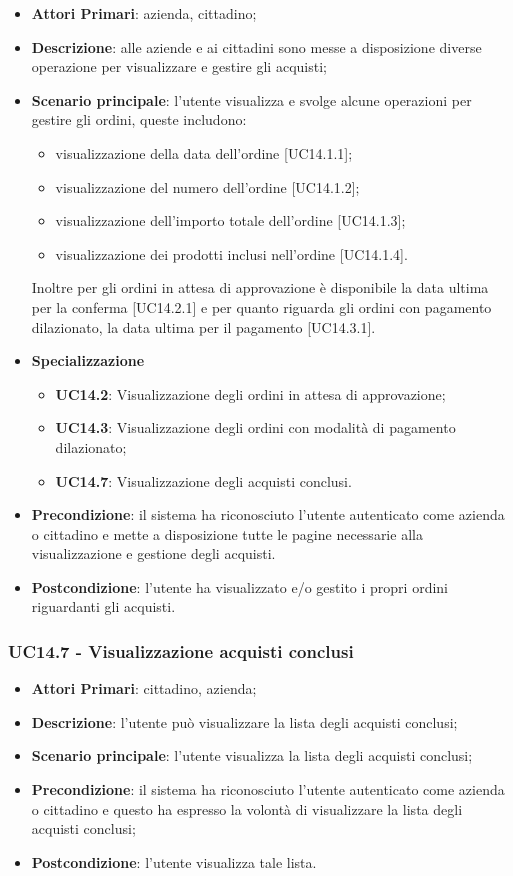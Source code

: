 \begin{itemize}
	\item \textbf{Attori Primari}: azienda, cittadino;
	\item \textbf{Descrizione}: alle aziende e ai cittadini sono messe a disposizione diverse operazione per visualizzare e gestire gli acquisti;
	\item \textbf{Scenario principale}: l'utente visualizza e svolge alcune operazioni per gestire gli ordini, queste includono:
	\begin{itemize}
		\item visualizzazione della data dell'ordine [UC14.1.1];
		\item visualizzazione del numero dell'ordine [UC14.1.2];
		\item visualizzazione dell'importo totale dell'ordine [UC14.1.3];
		\item visualizzazione dei prodotti inclusi nell'ordine [UC14.1.4].
	\end{itemize}
	Inoltre per gli ordini in attesa di approvazione è disponibile la data ultima per la conferma [UC14.2.1] e per quanto riguarda gli ordini con pagamento dilazionato,  la data ultima per il pagamento [UC14.3.1].
	\item \textbf{Specializzazione}
	\begin{itemize}
		\item \textbf{UC14.2}: Visualizzazione degli ordini in attesa di approvazione;
		\item \textbf{UC14.3}: Visualizzazione degli ordini con modalità di pagamento dilazionato;
		\item \textbf{UC14.7}: Visualizzazione degli acquisti conclusi.
	\end{itemize}
	\item \textbf{Precondizione}: il sistema ha riconosciuto l'utente autenticato come azienda o cittadino e mette a disposizione tutte le pagine necessarie alla visualizzazione e gestione degli acquisti.
	\item \textbf{Postcondizione}: l'utente ha visualizzato e/o gestito i propri ordini riguardanti gli acquisti.
\end{itemize} 
\subsubsection{UC14.7 - Visualizzazione acquisti conclusi}
\begin{itemize}
	\item \textbf{Attori Primari}: cittadino, azienda;
	\item \textbf{Descrizione}: l'utente può visualizzare la lista degli acquisti conclusi;
	\item \textbf{Scenario principale}: l'utente visualizza la lista degli acquisti conclusi;
	\item \textbf{Precondizione}: il sistema ha riconosciuto l'utente autenticato come azienda o cittadino e questo ha espresso la volontà di visualizzare la lista degli acquisti conclusi;
	\item \textbf{Postcondizione}: l'utente visualizza tale lista.
\end{itemize}
